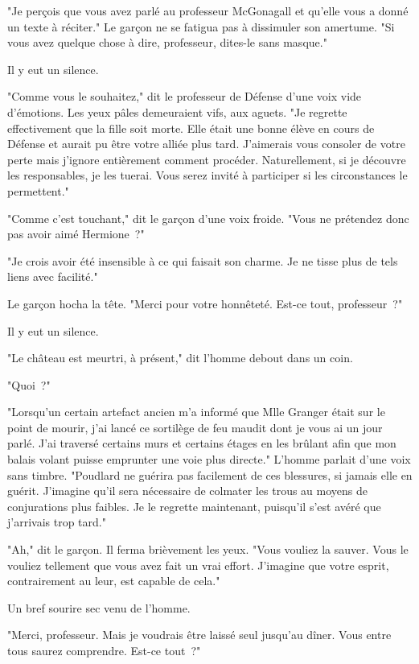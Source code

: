 "Je perçois que vous avez parlé au professeur McGonagall et qu'elle vous a donné un texte à réciter." Le garçon ne se fatigua pas à dissimuler son amertume. "Si vous avez quelque chose à dire, professeur, dites-le sans masque."

Il y eut un silence.

"Comme vous le souhaitez," dit le professeur de Défense d'une voix vide d'émotions. Les yeux pâles demeuraient vifs, aux aguets. "Je regrette effectivement que la fille soit morte. Elle était une bonne élève en cours de Défense et aurait pu être votre alliée plus tard. J'aimerais vous consoler de votre perte mais j'ignore entièrement comment procéder. Naturellement, si je découvre les responsables, je les tuerai. Vous serez invité à participer si les circonstances le permettent."

"Comme c'est touchant," dit le garçon d'une voix froide. "Vous ne prétendez donc pas avoir aimé Hermione~?"

"Je crois avoir été insensible à ce qui faisait son charme. Je ne tisse plus de tels liens avec facilité."

Le garçon hocha la tête. "Merci pour votre honnêteté. Est-ce tout, professeur~?"

Il y eut un silence.

"Le château est meurtri, à présent," dit l'homme debout dans un coin.

"Quoi~?"

"Lorsqu'un certain artefact ancien m'a informé que Mlle Granger était sur le point de mourir, j'ai lancé ce sortilège de feu maudit dont je vous ai un jour parlé. J'ai traversé certains murs et certains étages en les brûlant afin que mon balais volant puisse emprunter une voie plus directe." L'homme parlait d'une voix sans timbre. "Poudlard ne guérira pas facilement de ces blessures, si jamais elle en guérit. J'imagine qu'il sera nécessaire de colmater les trous au moyens de conjurations plus faibles. Je le regrette maintenant, puisqu'il s'est avéré que j'arrivais trop tard."

"Ah," dit le garçon. Il ferma brièvement les yeux. "Vous vouliez la sauver. Vous le vouliez tellement que vous avez fait un vrai effort. J'imagine que votre esprit, contrairement au leur, est capable de cela."

Un bref sourire sec venu de l'homme.

"Merci, professeur. Mais je voudrais être laissé seul jusqu'au dîner. Vous entre tous saurez comprendre. Est-ce tout~?"

